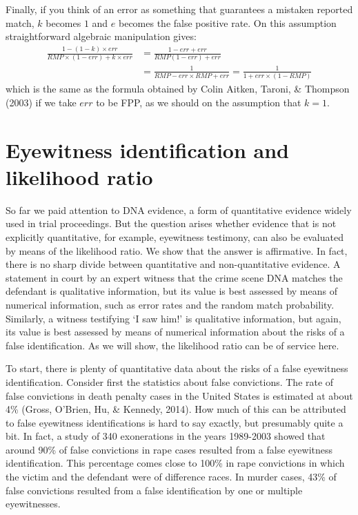 \documentclass[
  10pt,
  dvipsnames,enabledeprecatedfontcommands]{scrartcl}
\begin{document}

Finally, if you think of an error as something that guarantees a
mistaken reported match, \(k\) becomes \(1\) and \(e\) becomes the false
positive rate. On this assumption straightforward algebraic manipulation
gives: \begin{align*}
 \frac{1 - (1-k)\times err}{RMP\times (1-err)+k\times err} & = \frac{1-err+err}{RMP(1-err)+err}\\
 & = \frac{1}{RMP - err\times RMP + err} = \frac{1}{1 + err\times(1-RMP)}
\end{align*} \noindent which is the same as the formula obtained by
Colin Aitken, Taroni, \& Thompson (2003) if we take \(err\) to be FPP,
as we should on the assumption that \(k=1\).

\hypertarget{eyewitness-identification-and-likelihood-ratio}{%
\section{\texorpdfstring{Eyewitness identification and likelihood ratio
\label{sec:eyewitness}}{Eyewitness identification and likelihood ratio }}\label{eyewitness-identification-and-likelihood-ratio}}

So far we paid attention to DNA evidence, a form of quantitative
evidence widely used in trial proceedings. But the question arises
whether evidence that is not explicitly quantitative, for example,
eyewitness testimony, can also be evaluated by means of the likelihood
ratio. We show that the answer is affirmative. In fact, there is no
sharp divide between quantitative and non-quantitative evidence. A
statement in court by an expert witness that the crime scene DNA matches
the defendant is qualitative information, but its value is best assessed
by means of numerical information, such as error rates and the random
match probability. Similarly, a witness testifying `I saw him!' is
qualitative information, but again, its value is best assessed by means
of numerical information about the risks of a false identification. As
we will show, the likelihood ratio can be of service here.

To start, there is plenty of quantitative data about the risks of a
false eyewitness identification. Consider first the statistics about
false convictions. The rate of false convictions in death penalty cases
in the United States is estimated at about 4\% (Gross, O'Brien, Hu, \&
Kennedy, 2014). How much of this can be attributed to false eyewitness
identifications is hard to say exactly, but presumably quite a bit. In
fact, a study of 340 exonerations in the years 1989-2003 showed that
around 90\% of false convictions in rape cases resulted from a false
eyewitness identification. This percentage comes close to 100\% in rape
convictions in which the victim and the defendant were of difference
races. In murder cases, 43\% of false convictions resulted from a false
identification by one or multiple eyewitnesses. 
\end{document}
